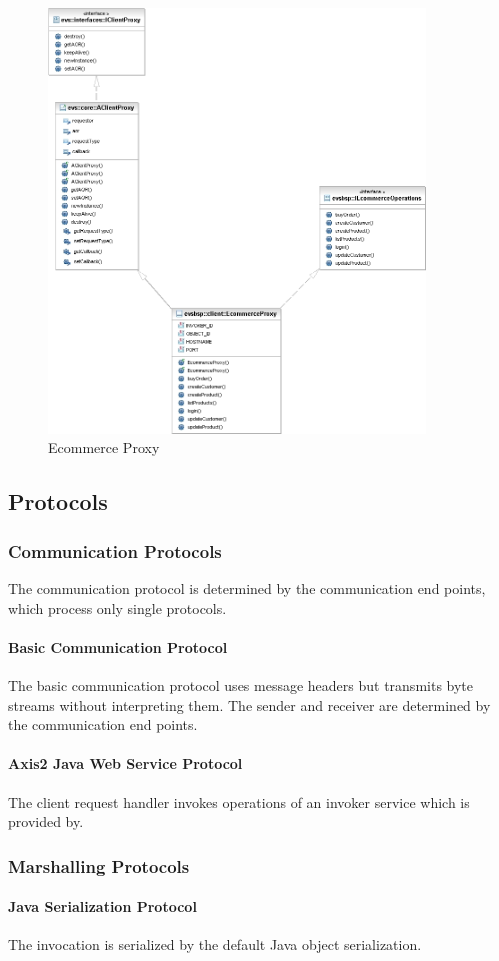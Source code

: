 \begin{figure}[ht!]
	\centering\includegraphics[width=10cm]{uml/EcommerceProxy.jpg} 
	\caption{Ecommerce Proxy}
	\label{fig:clientproxy}
\end{figure}

\subsection{Protocols}

\subsubsection{Communication Protocols}

The communication protocol is determined by the communication end points, which process only single protocols.

\paragraph{Basic Communication Protocol}

The basic communication protocol uses message headers but transmits byte streams without interpreting them.
The sender and receiver are determined by the communication end points.

\paragraph{Axis2 Java Web Service Protocol}

The client request handler invokes operations of an invoker service which is provided by.

\subsubsection{Marshalling Protocols}

\paragraph{Java Serialization Protocol}

The invocation is serialized by the default Java object serialization.
